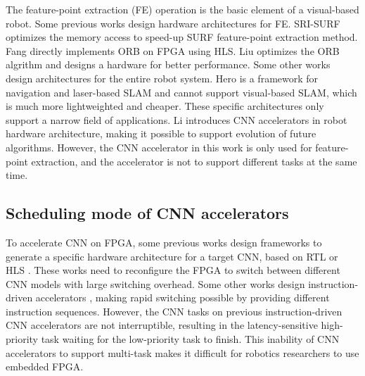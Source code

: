 The feature-point extraction (FE) operation is the basic element of a visual-based robot.
Some previous works design hardware architectures for FE.
SRI-SURF \cite{jia2016sri} optimizes the memory access to speed-up SURF \cite{bay2006surf} feature-point extraction method. 
Fang \cite{fang2017fpga} directly implements ORB on FPGA using HLS. Liu \cite{liu2019eslam} optimizes the ORB algrithm and designs a hardware for better performance.
Some other works design architectures for the entire robot system. Hero \cite{shi2018hero} is a framework for navigation and laser-based SLAM and cannot support visual-based SLAM, which is much more lightweighted and cheaper. These specific architectures only support a narrow field of applications. 
Li \cite{li2019879gops} introduces CNN accelerators in robot hardware architecture, making it possible to support evolution of future algorithms. 
However, the CNN accelerator in this work\cite{li2019879gops} is only used for feature-point extraction, and the accelerator is not to support different tasks at the same time.



\subsection{ Scheduling mode of CNN accelerators }

To accelerate CNN on FPGA, some previous works design frameworks to generate a specific hardware architecture for a target CNN, based on  RTL \cite{li_high_2016} or HLS \cite{lu_evaluating_2017}. These works need to reconfigure the FPGA to switch between different CNN models with large switching overhead. Some other works design instruction-driven accelerators \cite{yu2018instruction,qiu2016going,guo2017angel}, making rapid switching possible by providing different instruction sequences. 
However, the CNN tasks on previous instruction-driven CNN accelerators are not interruptible, resulting in the latency-sensitive high-priority task waiting for the low-priority task to finish. This inability of CNN accelerators to support multi-task makes it difficult for robotics researchers to use embedded FPGA.

